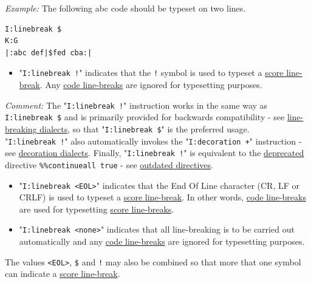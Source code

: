 \documentclass[oneside]{book}
\begin{document}
\emph{Example:} The following abc code should be typeset on two lines.

\begin{verbatim}
I:linebreak $
K:G
|:abc def|$fed cba:|
\end{verbatim}

\begin{itemize}
\item
  "\texttt{I:linebreak\ !}" indicates that the \texttt{!} symbol is used
  to typeset a \protect\hyperlink{score_line-break_definition}{score
  line-break}. Any \protect\hyperlink{code_line-break_definition}{code
  line-breaks} are ignored for typesetting purposes.
\end{itemize}

\emph{Comment:} The "\texttt{I:linebreak\ !}" instruction works in the
same way as \texttt{I:linebreak\ \$} and is primarily provided for
backwards compatibility - see
\protect\hyperlink{line-breaking_dialects}{line-breaking dialects}, so
that "\texttt{I:linebreak\ \$}" is the preferred usage.
"\texttt{I:linebreak\ !}" also automatically invokes the
"\texttt{I:decoration\ +}" instruction - see
\protect\hyperlink{decoration_dialects}{decoration dialects}. Finally,
"\texttt{I:linebreak\ !}" is equivalent to the
\protect\hyperlink{outdated_syntax}{deprecated} directive
\texttt{\%\%continueall\ true} - see
\protect\hyperlink{outdated_directives}{outdated directives}.

\begin{itemize}
\item
  "\texttt{I:linebreak\ \textless{}EOL\textgreater{}}" indicates that
  the End Of Line character (CR, LF or CRLF) is used to typeset a
  \protect\hyperlink{score_line-break_definition}{score line-break}. In
  other words, \protect\hyperlink{code_line-break_definition}{code
  line-breaks} are used for typesetting
  \protect\hyperlink{score_line-break_definition}{score line-breaks}.
\end{itemize}

\begin{itemize}
\item
  "\texttt{I:linebreak\ \textless{}none\textgreater{}}" indicates that
  all line-breaking is to be carried out automatically and any
  \protect\hyperlink{code_line-break_definition}{code line-breaks} are
  ignored for typesetting purposes.
\end{itemize}

The values \texttt{\textless{}EOL\textgreater{}}, \texttt{\$} and
\texttt{!} may also be combined so that more that one symbol can
indicate a \protect\hyperlink{score_line-break_definition}{score
line-break}.
\end{document}
